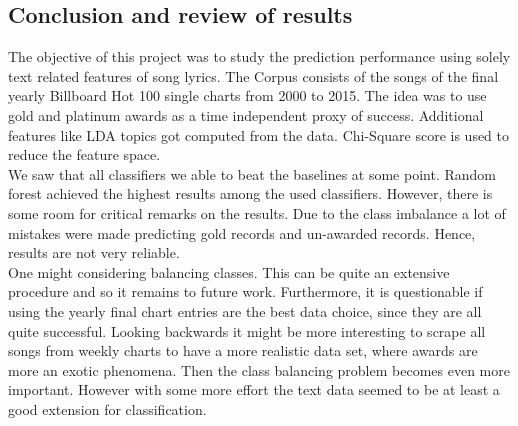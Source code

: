 \documentclass[12pt,a4paper,bibliography=totocnumbered,listof=totocnumbered]{scrartcl}
\begin{document}
\subsection{Conclusion and review of results}

The objective of this project was to study the prediction performance using solely text related features of song lyrics. The Corpus consists of the songs of the final yearly Billboard Hot 100 single charts from 2000 to 2015. The idea was to use gold and platinum awards as a time independent proxy of success. Additional features like LDA topics got computed from the data. Chi-Square score is used to reduce the feature space. \\
We saw that all classifiers we able to beat the baselines at some point. Random forest achieved the highest results among the used classifiers. However, there is some room for critical remarks on the results. Due to the class imbalance a lot of mistakes were made predicting gold records and un-awarded records. Hence, results are not very reliable. \\
One might considering balancing classes. This can be quite an extensive procedure and so it remains to future work. Furthermore, it is questionable if using the yearly final chart entries are the best data choice, since they are all quite successful. Looking backwards it might be more interesting to scrape all songs from weekly charts to have a more realistic data set, where awards are more an exotic phenomena. Then the class balancing problem becomes even more important. However with some more effort the text data seemed to be at least a good extension for classification.


\pagebreak

\renewcommand\refname{List of Literature}




\end{document}
